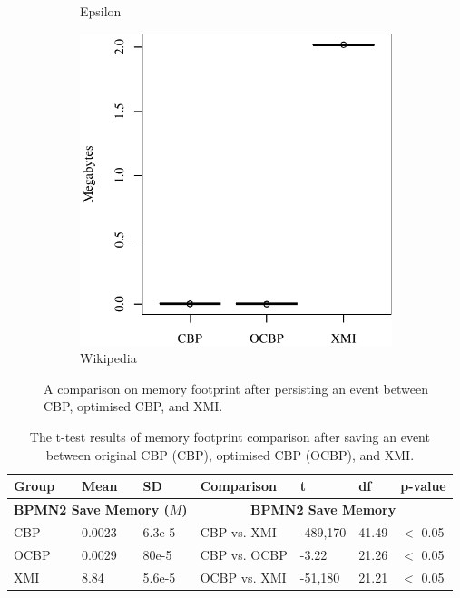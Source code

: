 \documentclass{llncs}
\begin{document}
{\begin{figure}
\begin{subfigure}{0.325\textwidth}
            \caption{Epsilon}
            \label{fig:save_memory_epsilon}
        \end{subfigure}
        \hfill
        \begin{subfigure}{0.325\textwidth}
            \centering
            \includegraphics[width=\linewidth]{images/save_memory_wikipedia}
            \caption{Wikipedia}
            \label{fig:save_memory_wikipedia}
        \end{subfigure}
        \caption{A comparison on memory footprint after persisting an event between CBP, optimised CBP, and XMI.}
        \label{fig:savememory}
    \end{figure}

   \begin{table}[t]
       \footnotesize
       \centering
       \caption{The t-test results of memory footprint comparison after saving an event between original CBP (CBP), optimised CBP (OCBP), and XMI.}
       \label{table:ttest_results_save_memory}
       \begin{tabular}
           {|p{}p{}p{}|p{}p{}p{}p{}|}
           \hline 
           
           Group & Mean & SD & Comparison & t  & df & p-value \\
           \hline 
           \multicolumn{3}{|c|}{\textbf{BPMN2 Save Memory ($M$)}} & \multicolumn{4}{c|}{\textbf{BPMN2 Save Memory}} \\
           CBP &0.0023    & 6.3e-5 & CBP vs. XMI &  -489,170    & 41.49 & $<$ 0.05 \\  
           OCBP &0.0029    & 80e-5 & CBP vs. OCBP & -3.22 & 21.26 & $<$ 0.05 \\
           XMI & 8.84   & 5.6e-5 & OCBP vs. XMI & -51,180    &  21.21  & $<$ 0.05 \\ 
           \hline 
           

\end{tabular}
\end{table}}
\end{document}
